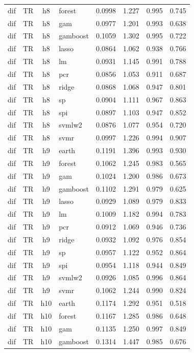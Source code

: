 \begin{ThreePartTable}
\begin{longtable}[t]{llclcccc}
dif & TR & h8 & forest & 0.0998 & 1.227 & 0.995 & 0.745\\
dif & TR & h8 & gam & 0.0977 & 1.201 & 0.993 & 0.638\\
dif & TR & h8 & gamboost & 0.1059 & 1.302 & 0.995 & 0.722\\
dif & TR & h8 & lasso & 0.0864 & 1.062 & 0.938 & 0.766\\
dif & TR & h8 & lm & 0.0931 & 1.145 & 0.991 & 0.788\\
dif & TR & h8 & pcr & 0.0856 & 1.053 & 0.911 & 0.687\\
dif & TR & h8 & ridge & 0.0868 & 1.068 & 0.947 & 0.801\\
dif & TR & h8 & sp & 0.0904 & 1.111 & 0.967 & 0.863\\
dif & TR & h8 & spi & 0.0897 & 1.103 & 0.947 & 0.852\\
dif & TR & h8 & svmlw2 & 0.0876 & 1.077 & 0.954 & 0.720\\
dif & TR & h8 & svmr & 0.0997 & 1.226 & 0.994 & 0.907\\
\addlinespace
dif & TR & h9 & earth & 0.1191 & 1.396 & 0.993 & 0.930\\
dif & TR & h9 & forest & 0.1062 & 1.245 & 0.983 & 0.565\\
dif & TR & h9 & gam & 0.1024 & 1.200 & 0.986 & 0.673\\
dif & TR & h9 & gamboost & 0.1102 & 1.291 & 0.979 & 0.625\\
dif & TR & h9 & lasso & 0.0929 & 1.089 & 0.979 & 0.833\\
dif & TR & h9 & lm & 0.1009 & 1.182 & 0.994 & 0.783\\
dif & TR & h9 & pcr & 0.0912 & 1.069 & 0.946 & 0.736\\
dif & TR & h9 & ridge & 0.0932 & 1.092 & 0.976 & 0.854\\
dif & TR & h9 & sp & 0.0957 & 1.122 & 0.952 & 0.864\\
dif & TR & h9 & spi & 0.0954 & 1.118 & 0.944 & 0.849\\
dif & TR & h9 & svmlw2 & 0.0926 & 1.085 & 0.996 & 0.864\\
dif & TR & h9 & svmr & 0.1062 & 1.244 & 0.990 & 0.824\\
\addlinespace
dif & TR & h10 & earth & 0.1174 & 1.292 & 0.951 & 0.518\\
dif & TR & h10 & forest & 0.1167 & 1.285 & 0.986 & 0.648\\
dif & TR & h10 & gam & 0.1135 & 1.250 & 0.997 & 0.849\\
dif & TR & h10 & gamboost & 0.1314 & 1.447 & 0.985 & 0.676\\

\end{longtable}
\end{ThreePartTable}
